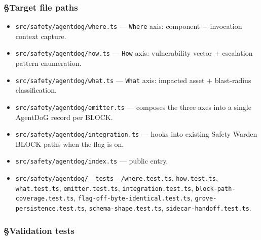 \documentclass[11pt,letterpaper]{article}
\providecommand{\tightlist}{\setlength{\itemsep}{0pt}\setlength{\parskip}{0pt}}
\begin{document}
\subsubsection{§Target file paths}

\begin{itemize}
\tightlist
\item
  \texttt{src/safety/agentdog/where.ts} --- \texttt{Where} axis:
  component + invocation context capture.
\item
  \texttt{src/safety/agentdog/how.ts} --- \texttt{How} axis:
  vulnerability vector + escalation pattern enumeration.
\item
  \texttt{src/safety/agentdog/what.ts} --- \texttt{What} axis: impacted
  asset + blast-radius classification.
\item
  \texttt{src/safety/agentdog/emitter.ts} --- composes the three axes
  into a single AgentDoG record per BLOCK.
\item
  \texttt{src/safety/agentdog/integration.ts} --- hooks into existing
  Safety Warden BLOCK paths when the flag is on.
\item
  \texttt{src/safety/agentdog/index.ts} --- public entry.
\item
  \texttt{src/safety/agentdog/\_\_tests\_\_/where.test.ts},
  \texttt{how.test.ts}, \texttt{what.test.ts}, \texttt{emitter.test.ts},
  \texttt{integration.test.ts}, \texttt{block-path-coverage.test.ts},
  \texttt{flag-off-byte-identical.test.ts},
  \texttt{grove-persistence.test.ts}, \texttt{schema-shape.test.ts},
  \texttt{sidecar-handoff.test.ts}.
\end{itemize}

\subsubsection{§Validation tests}
\end{document}
